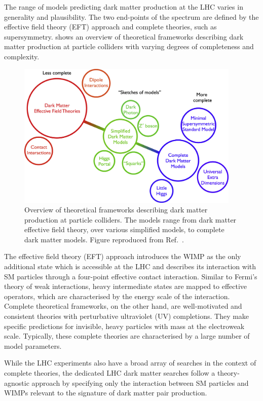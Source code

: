The range of models predicting dark matter production at the LHC varies in generality and plausibility. The two end-points of the spectrum are defined by the effective field theory (EFT) approach and complete theories, such as supersymmetry.  shows an overview of theoretical frameworks describing dark matter production at particle colliders with varying degrees of completeness and complexity.
\begin{figure}[htbp]
    \centering
    \includegraphics[width=0.95\textwidth]{figures/darkmatter/models.jpg}
    \caption{Overview of theoretical frameworks describing dark matter production at particle colliders. The models range from dark matter effective field theory, over various simplified models, to complete dark matter models. Figure reproduced from Ref.~\cite{Abdallah2015}.}
    \label{fig:dm:models:overview}
\end{figure}

The effective field theory (EFT) approach introduces the WIMP as the only additional state which is accessible at the LHC and describes its interaction with SM particles through a four-point effective contact interaction. Similar to Fermi's theory of weak interactions, heavy intermediate states are mapped to effective operators, which are characterised by the energy scale of the interaction.
Complete theoretical frameworks, on the other hand, are well-motivated and consistent theories with perturbative ultraviolet (UV) completions. They make specific predictions for invisible, heavy particles with mass at the electroweak scale. Typically, these complete theories are characterised by a large number of model parameters.

While the LHC experiments also have a broad array of searches in the context of complete theories, the dedicated LHC dark matter searches follow a theory-agnostic approach by specifying only the interaction between SM particles and WIMPs relevant to the signature of dark matter pair production.


